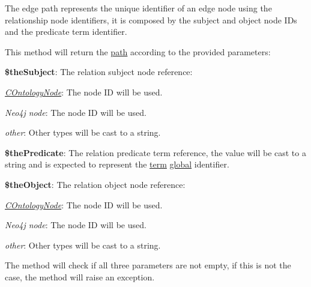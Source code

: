 The edge path represents the unique identifier of an edge node using the relationship node identifiers, it is composed by the subject and object node I\-Ds and the predicate term identifier.

This method will return the \hyperlink{}{path} according to the provided parameters\-:


\begin{DoxyItemize}
\item {\bfseries \$the\-Subject}\-: The relation subject node reference\-: 
\begin{DoxyItemize}
\item {\itshape \hyperlink{class_c_ontology_node}{C\-Ontology\-Node}}\-: The node I\-D will be used. 
\item {\itshape Neo4j node}\-: The node I\-D will be used. 
\item {\itshape other}\-: Other types will be cast to a string. 
\end{DoxyItemize}
\item {\bfseries \$the\-Predicate}\-: The relation predicate term reference, the value will be cast to a string and is expected to represent the \hyperlink{class_c_ontology_term}{term} \hyperlink{}{global} identifier. 
\item {\bfseries \$the\-Object}\-: The relation object node reference\-: 
\begin{DoxyItemize}
\item {\itshape \hyperlink{class_c_ontology_node}{C\-Ontology\-Node}}\-: The node I\-D will be used. 
\item {\itshape Neo4j node}\-: The node I\-D will be used. 
\item {\itshape other}\-: Other types will be cast to a string. 
\end{DoxyItemize}
\end{DoxyItemize}

The method will check if all three parameters are not empty, if this is not the case, the method will raise an exception.


